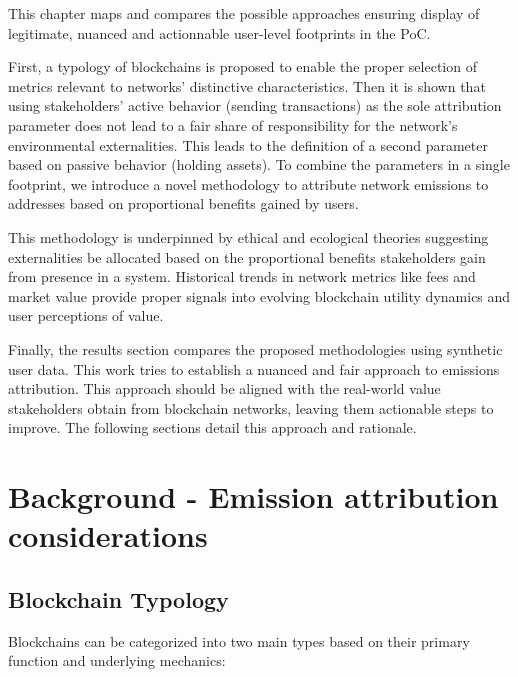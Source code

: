 \documentclass[11pt]{report}
\begin{document}

This chapter maps and compares the possible approaches ensuring display of legitimate, nuanced and actionnable user-level footprints in the PoC.

First, a typology of blockchains is proposed to enable the proper selection of metrics relevant to networks' distinctive characteristics. Then it is shown that using stakeholders' active behavior (sending transactions) as the sole attribution parameter does not lead to a fair share of responsibility for the network's environmental externalities. This leads to the definition of a second parameter based on passive behavior (holding assets). To combine the parameters in a single footprint, we introduce a novel methodology to attribute network emissions to addresses based on proportional benefits gained by users.

This methodology is underpinned by ethical and ecological theories suggesting externalities be allocated based on the proportional benefits stakeholders gain from presence in a system. Historical trends in network metrics like fees and market value provide proper signals into evolving blockchain utility dynamics and user perceptions of value.

Finally, the results section compares the proposed methodologies using synthetic user data. This work tries to establish a nuanced and fair approach to emissions attribution. This approach should be aligned with the real-world value stakeholders obtain from blockchain networks, leaving them actionable steps to improve. The following sections detail this approach and rationale.

\section{Background - Emission attribution considerations}

\subsection{Blockchain Typology \label{sec:blockchain_typology}}
Blockchains can be categorized into two main types based on their primary function and underlying mechanics:
\end{document}
